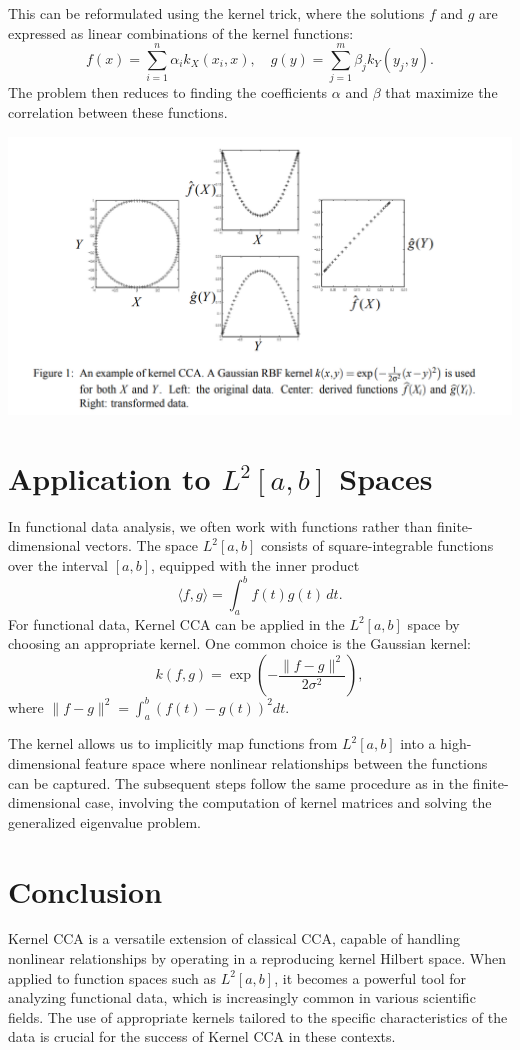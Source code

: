 \documentclass[12pt]{article}
\begin{document}
This can be reformulated using the kernel trick, where the solutions \( f \) and \( g \) are expressed as linear combinations of the kernel functions:
\[
f(x) = \sum_{i=1}^n \alpha_i k_X(x_i, x), \quad g(y) = \sum_{j=1}^m \beta_j k_Y(y_j, y).
\]
The problem then reduces to finding the coefficients \( \alpha \) and \( \beta \) that maximize the correlation between these functions.

\includegraphics[scale=0.35]{tmp_example.png}
\section{Application to \( L^2[a,b] \) Spaces}

In functional data analysis, we often work with functions rather than finite-dimensional vectors. The space \( L^2[a,b] \) consists of square-integrable functions over the interval \( [a, b] \), equipped with the inner product
\[
\langle f, g \rangle = \int_a^b f(t) g(t) \, dt.
\]
For functional data, Kernel CCA can be applied in the \( L^2[a,b] \) space by choosing an appropriate kernel. One common choice is the Gaussian kernel:
\[
k(f, g) = \exp\left(-\frac{\|f - g\|^2}{2\sigma^2}\right),
\]
where \( \|f - g\|^2 = \int_a^b (f(t) - g(t))^2 dt \).

The kernel allows us to implicitly map functions from \( L^2[a,b] \) into a high-dimensional feature space where nonlinear relationships between the functions can be captured. The subsequent steps follow the same procedure as in the finite-dimensional case, involving the computation of kernel matrices and solving the generalized eigenvalue problem.

\section{Conclusion}

Kernel CCA is a versatile extension of classical CCA, capable of handling nonlinear relationships by operating in a reproducing kernel Hilbert space. When applied to function spaces such as \( L^2[a,b] \), it becomes a powerful tool for analyzing functional data, which is increasingly common in various scientific fields. The use of appropriate kernels tailored to the specific characteristics of the data is crucial for the success of Kernel CCA in these contexts.
\end{document}

